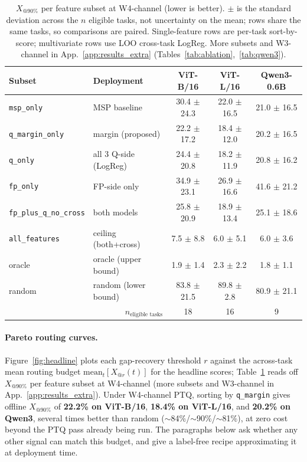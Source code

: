 \documentclass{article}
\makeatletter
\newcommand{\ptq}{\textsc{PTQ}\xspace}
\newcommand{\xat}[1]{\ensuremath{X_{@#1\%}}}
\makeatother
\begin{document}
\begin{table}[t]
\centering
\caption{\xat{90} per feature subset at W4-channel (lower is better). $\pm$ is the standard deviation across the $n$ eligible tasks, not uncertainty on the mean; rows share the same tasks, so comparisons are paired. Single-feature rows are per-task sort-by-score; multivariate rows use LOO cross-task LogReg. More subsets and W3-channel in App.~\ref{app:results_extra} (Tables~\ref{tab:ablation},~\ref{tab:qwen3}).}
\label{tab:ablation_main}
\small
\setlength{\tabcolsep}{4pt}
\begin{tabular}{llccc}
\toprule
Subset & Deployment & ViT-B/16 & ViT-L/16 & Qwen3-0.6B \\
\midrule
\texttt{msp\_only} & MSP baseline & 30.4 $\pm$ 24.3 & 22.0 $\pm$ 16.5 & 21.0 $\pm$ 16.5 \\
\texttt{q\_margin\_only} & margin (proposed) & 22.2 $\pm$ 17.2 & 18.4 $\pm$ 12.0 & 20.2 $\pm$ 16.5 \\
\texttt{q\_only} & all 3 Q-side (LogReg) & 24.4 $\pm$ 20.8 & 18.2 $\pm$ 11.9 & 20.8 $\pm$ 16.2 \\
\texttt{fp\_only} & FP-side only & 34.9 $\pm$ 23.1 & 26.9 $\pm$ 16.6 & 41.6 $\pm$ 21.2 \\
\texttt{fp\_plus\_q\_no\_cross} & both models & 25.8 $\pm$ 20.9 & 18.9 $\pm$ 13.4 & 25.1 $\pm$ 18.6 \\
\texttt{all\_features} & ceiling (both+cross) & 7.5 $\pm$ 8.8 & 6.0 $\pm$ 5.1 & 6.0 $\pm$ 3.6 \\
\midrule
oracle & oracle (upper bound) & 1.9 $\pm$ 1.4 & 2.3 $\pm$ 2.2 & 1.8 $\pm$ 1.1 \\
random & random (lower bound) & 83.8 $\pm$ 21.5 & 89.8 $\pm$ 2.8 & 80.9 $\pm$ 21.1 \\
\midrule
\multicolumn{2}{r}{$n_{\text{eligible tasks}}$} & 18 & 16 & 9 \\
\bottomrule
\end{tabular}
\end{table}

\paragraph{Pareto routing curves.}
Figure~\ref{fig:headline} plots each gap-recovery threshold $r$ against the across-task mean routing budget $\mathrm{mean}_t[X_{@r}(t)]$ for the headline scores; Table~\ref{tab:ablation_main} reads off \xat{90} per feature subset at W4-channel (more subsets and W3-channel in App.~\ref{app:results_extra}). Under W4-channel \ptq{}, sorting by \texttt{q\_margin} gives offline \xat{90} of \textbf{22.2\% on ViT-B/16}, \textbf{18.4\% on ViT-L/16}, and \textbf{20.2\% on Qwen3}, several times better than random ($\sim$84\%/$\sim$90\%/$\sim$81\%), at zero cost beyond the \ptq{} pass already being run. The paragraphs below ask whether any other signal can match this budget, and give a label-free recipe approximating it at deployment time.
\end{document}
